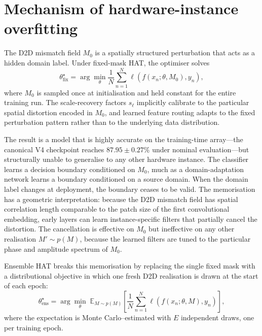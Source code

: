 \section{Mechanism of hardware-instance overfitting}
\label{sec:ch1-mechanism}

The D2D mismatch field $M_{0}$ is a spatially structured perturbation that acts as a hidden domain label.  Under fixed-mask HAT, the optimiser solves
\begin{equation}
    \theta_{\mathrm{fix}}^{\star} = \arg\min_{\theta} \frac{1}{N} \sum_{n=1}^{N} \ell\!\left(f(x_{n}; \theta, M_{0}), y_{n}\right),
    \label{eq:fixed-mask-ch1}
\end{equation}
where $M_{0}$ is sampled once at initialisation and held constant for the entire training run.  The scale-recovery factors $s_{\ell}$ implicitly calibrate to the particular spatial distortion encoded in $M_{0}$, and learned feature routing adapts to the fixed perturbation pattern rather than to the underlying data distribution.

The result is a model that is highly accurate on the training-time array---the canonical V4 checkpoint reaches $87.95\pm0.27\%$ under nominal evaluation---but structurally unable to generalise to any other hardware instance.  The classifier learns a decision boundary conditioned on $M_{0}$, much as a domain-adaptation network learns a boundary conditioned on a source domain.  When the domain label changes at deployment, the boundary ceases to be valid.  The memorisation has a geometric interpretation: because the D2D mismatch field has spatial correlation length comparable to the patch size of the first convolutional embedding, early layers can learn instance-specific filters that partially cancel the distortion.  The cancellation is effective on $M_{0}$ but ineffective on any other realisation $M' \sim p(M)$, because the learned filters are tuned to the particular phase and amplitude spectrum of $M_{0}$.

Ensemble HAT breaks this memorisation by replacing the single fixed mask with a distributional objective in which one fresh D2D realisation is drawn at the start of each epoch:
\begin{equation}
    \theta_{\mathrm{ens}}^{\star} = \arg\min_{\theta} \; \mathbb{E}_{M \sim p(M)}\!\left[\frac{1}{N}\sum_{n=1}^{N}\ell\!\left(f(x_{n};\theta,M),y_{n}\right)\right],
    \label{eq:ensemble-hat-ch1}
\end{equation}
where the expectation is Monte Carlo--estimated with $E$ independent draws, one per training epoch.

